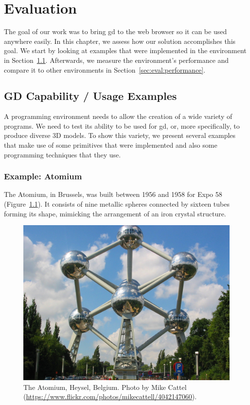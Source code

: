 
\chapter{Evaluation}
\label{chapter:evaluation}
The goal of our work was to bring \gls{gd} to the web browser so it can be used anywhere easily.
In this chapter, we assess how our solution accomplishes this goal.
We start by looking at examples that were implemented in the environment in Section~\ref{sec:eval:gd:capable}.
Afterwards, we measure the environment's performance and compare it to other environments in Section~\ref{sec:eval:performance}.


\section{GD Capability / Usage Examples}
\label{sec:eval:gd:capable}
A programming environment needs to allow the creation of a wide variety of programs.
We need to test its ability to be used for \gls{gd}, or, more specifically, to produce diverse 3D models.
To show this variety, we present several examples that make use of some primitives that were implemented and also some programming techniques that they use.



\subsection{Example: Atomium}
The Atomium, in Brussels, was built between 1956 and 1958 for Expo 58 (Figure~\ref{fig:atomium:photo}).
It consists of nine metallic spheres connected by sixteen tubes forming its shape, mimicking the arrangement of an iron crystal structure.

\begin{figure}
  \centering
  \includegraphics[width=0.5\linewidth]{./images/atomium_photo}
  \caption[The Atomium in Brussels.]{The Atomium, Heysel, Belgium. Photo by Mike Cattel (\url{https://www.flickr.com/photos/mikecattell/4042147060}).}
  \label{fig:atomium:photo}
\end{figure}

